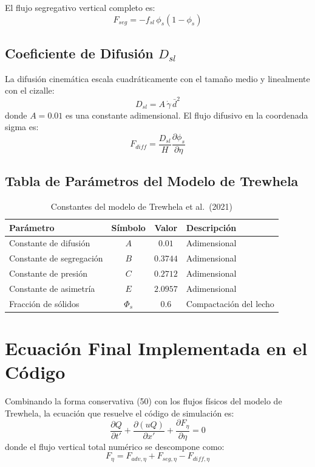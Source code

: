 \documentclass[11pt,a4paper]{article}
\begin{document}
El flujo segregativo vertical completo es:
\begin{equation}
    F_{seg} = -f_{sl} \, \phi_s(1 - \phi_s)
\end{equation}

\subsection{Coeficiente de Difusión $D_{sl}$}
La difusión cinemática escala cuadráticamente con el tamaño medio y linealmente con el cizalle:
\begin{equation}
    D_{sl} = A \, \dot{\gamma} \, \bar{d}^2
\end{equation}
donde $A = 0.01$ es una constante adimensional. El flujo difusivo en la coordenada sigma es:
\begin{equation}
    F_{diff} = \frac{D_{sl}}{H}\frac{\partial \phi_s}{\partial \eta}
\end{equation}

\subsection{Tabla de Parámetros del Modelo de Trewhela}
\begin{table}[h!]
\centering
\caption{Constantes del modelo de Trewhela et al.\ (2021)}
\vspace{0.2cm}
\begin{tabular}{lccl}
\toprule
\textbf{Parámetro} & \textbf{Símbolo} & \textbf{Valor} & \textbf{Descripción} \\
\midrule
Constante de difusión    & $A$ & $0.01$   & Adimensional \\
Constante de segregación & $B$ & $0.3744$ & Adimensional \\
Constante de presión     & $C$ & $0.2712$ & Adimensional \\
Constante de asimetría   & $E$ & $2.0957$ & Adimensional \\
Fracción de sólidos      & $\Phi_s$ & $0.6$ & Compactación del lecho \\
\bottomrule
\end{tabular}
\end{table}


\section{Ecuación Final Implementada en el Código}
Combinando la forma conservativa (50) con los flujos físicos del modelo de Trewhela, la ecuación que resuelve el código de simulación es:
\begin{equation}
    \boxed{\frac{\partial Q}{\partial t'} + \frac{\partial(uQ)}{\partial x'} + \frac{\partial F_\eta}{\partial \eta} = 0}
\end{equation}
donde el flujo vertical total numérico se descompone como:
\begin{equation}
    F_\eta = F_{adv, \eta} + F_{seg, \eta} - F_{diff, \eta}
\end{equation}
\end{document}
